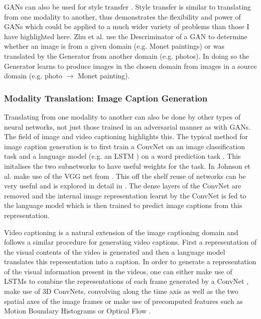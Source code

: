 \acp{GAN} can also be used for style transfer \cite{zhu2017unpaired}. Style transfer is similar to translating from one modality to another, thus \cite{zhu2017unpaired} demonstrates the flexibility and power of \acp{GAN} which could be applied to a much wider variety of problems than those I have highlighted here. Zhu et al. use the Descriminator of a \ac{GAN} to determine whether an image is from a given domain (e.g. Monet paintings) or was translated by the Generator from another domain (e.g. photos). In doing so the Generator learns to produce images in the chosen domain from images in a source domain (e.g. photo $\rightarrow$ Monet painting).

\subsubsection{Modality Translation: Image Caption Generation}
Translating from one modality to another can also be done by other types of neural networks, not just those trained in an adversarial manner as with \acp{GAN}.
The field of image and video captioning highlights this. The typical method for image caption generation is to first train a \ac{ConvNet} on an image classification task and a language model (e.g. an \ac{LSTM} \cite{hochreiter1997long}) on a word prediction task \cite{vinyals2015show, venugopalan2014translating, johnson2016densecap}. This initalises the two subnetworks to have useful weights for the task. In \cite{johnson2016densecap} Johnson et al. make use of the VGG net from \cite{simonyan2014very}. This off the shelf reuse of networks can be very useful and is explored in detail in \cite{keller}.
The dense layers of the \ac{ConvNet} are removed and the internal image representation learnt by the \ac{ConvNet} is fed to the language model which is then trained to predict image captions from this representation.

Video captioning is a natural extension of the image captioning domain and follows a similar procedure for generating video captions. First a representation of the visual contents of the video is generated and then a language model translates this representation into a caption. In order to generate a representation of the visual information  present in the videos, one can either make use of \acp{LSTM} to combine the representations of each frame generated by a \ac{ConvNet} \cite{donahue2015long}, make use of 3D \acp{ConvNet}, convolving along the time axis as well as the two spatial axes of the image frames \cite{yao2015describing, yao2015video} or make use of precomputed features such as Motion Boundary Histograms or Optical Flow \cite{rohrbach2014coherent, rohrbach2013translating}.

